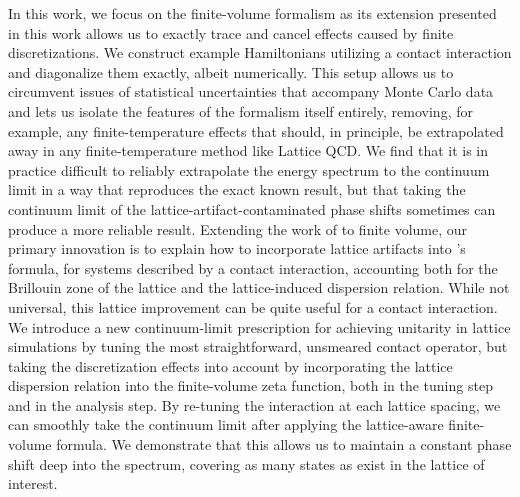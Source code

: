 In this work, we focus on the \Luscher finite-volume formalism as its extension presented in this work allows us to exactly trace and cancel effects caused by finite discretizations.
We construct example Hamiltonians utilizing a contact interaction and diagonalize them exactly, albeit numerically.
This setup allows us to circumvent issues of statistical uncertainties that accompany Monte Carlo data and lets us isolate the features of the formalism itself entirely, removing, for example, any finite-temperature effects that should, in principle, be extrapolated away in any finite-temperature method like Lattice QCD.
We find that it is in practice difficult to reliably extrapolate the energy spectrum to the continuum limit in a way that reproduces the exact known result, but that taking the continuum limit of the lattice-artifact-contaminated phase shifts sometimes can produce a more reliable result.
Extending the work of  to finite volume, our primary innovation is to explain how to incorporate lattice artifacts into \Luscher's formula, for systems described by a contact interaction, accounting both for the Brillouin zone of the lattice and the lattice-induced dispersion relation.
While not universal, this lattice improvement can be quite useful for a contact interaction.
We introduce a new continuum-limit prescription for achieving unitarity in lattice simulations by tuning the most straightforward, unsmeared contact operator, but taking the discretization effects into account by incorporating the lattice dispersion relation into the finite-volume zeta function, both in the tuning step and in the analysis step.
By re-tuning the interaction at each lattice spacing, we can smoothly take the continuum limit after applying the lattice-aware finite-volume formula.
We demonstrate that this allows us to maintain a constant phase shift deep into the spectrum, covering as many \Aoneg states as exist in the lattice of interest.

